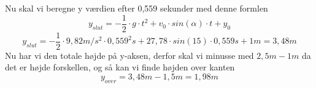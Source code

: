 Nu skal vi beregne y værdien efter 0,559 sekunder med denne formlen
\begin{equation*}
    y_{slut} = -\frac{1}{2}\cdot g\cdot t^{2} + v_{0}\cdot sin(\alpha)\cdot t + y_{0}
\end{equation*}
\begin{equation*}
    y_{slut} = -\frac{1}{2}\cdot 9,82m/s^{2}\cdot 0,559^{2} s + 27,78\cdot sin(15)\cdot 0,559s + 1m = 3,48m
\end{equation*}
Nu har vi den totale højde på y-aksen, derfor skal vi minusse med \begin{math}2,5m - 1m\end{math} da det er højde forskellen, og så kan vi finde højden over kanten
\begin{equation*}
    y_{over} = 3,48m - 1,5m = 1,98m
\end{equation*}
\newpage